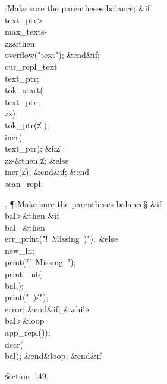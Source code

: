 :Make sure the parentheses balance\X;\6
\&{if}\1\1\8\\{text\_ptr}\?>\?\\{max\_texts}\?-\?\\{zz}\2\8\&{then}\6
\\{overflow}\?\1(\?\.{"text"}\?\2)\?;\2\6
\&{end}\8\2\&{if}\1;\6
\\{cur\_repl\_text}\?\K\?\\{text\_ptr};\5
\\{tok\_start}\?\1(\?\\{text\_ptr}\?+\?\\{zz}\?\2)\K\?\\{tok\_ptr}\?\1(\?\|z\?%
\2)\?;\5
\\{incr}\?\1(\?\\{text\_ptr}\?\2)\?;\6
\&{if}\1\1\8\|z\?=\?\\{zz}\?-\2\8\&{then}\6
\|z\?\K{};\6
\4\&{else}\6
\\{incr}\?\1(\?\|z\?\2)\?;\2\6
\&{end}\8\2\&{if}\1;\2\6
\&{end}\8\\{scan\_repl};\par
\fi

. \P\?:Make sure the parentheses balance\X\S\?\6
\&{if}\1\1\8\\{bal}\?>\2\8\&{then}\6
\&{if}\1\1\8\\{bal}\?=\2\8\&{then}\6
\\{err\_print}\?\1(\?\.{"!\ Missing\ )"}\?\2)\?;\6
\4\&{else}\6
\\{new\_ln};\5
\\{print}\?\1(\?\.{"!\ Missing\ "}\?\2)\?;\5
\\{print\_int}\?\1(\?\\{bal}\?,\?\2)\?;\5
\\{print}\?\1(\?\.{"\ )\'s"}\?\2)\?;\5
\\{error};\2\6
\&{end}\8\2\&{if}\1;\6
\1\&{while}\8\\{bal}\?>\8\&{loop}\6
\\{app\_repl}\?\1(\?\H{)}\?\2)\?;\5
\\{decr}\?\1(\?\\{bal}\?\2)\?;\2\6
\&{end}\8\&{loop};\2\6
\&{end}\8\2\&{if}\1\par
\U section~149.\fi

